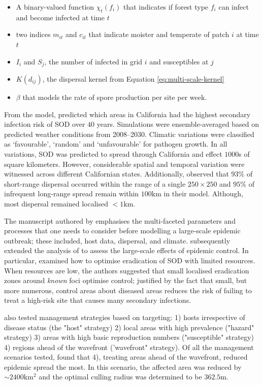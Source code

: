 \begin{itemize}
    \item A binary-valued function $\chi_t(f_i)$ that indicates if forest type $f_i$ can infect and become infected at time $t$
    \item two indices $m_{it}$ and $c_{it}$ that indicate moister and temperate of patch $i$ at time $t$
    \item $I_i$ and $S_j$, the number of infected in grid $i$ and susceptibles at $j$
    \item $K(d_{ij})$, the dispersal kernel from Equation \ref{eq:multi-scale-kernel}
    \item $\beta$ that models the rate of spore production per site per week.
\end{itemize}

From the model, \cite{meentemeyer2004mapping} predicted which areas in California
had the highest secondary infection risk of SOD over $40$ years.
Simulations were ensemble-averaged based on predicted weather conditions from 2008–2030.
Climatic variations were classified as `favourable', `random' and `unfavourable' for
pathogen growth.
In all variations, SOD was predicted to spread through California and effect $1000$s
of square kilometers. However, considerable spatial and temporal variation were witnessed
across different Californian states. Additionally, \cite{meentemeyer2004mapping} 
observed that $93\%$ of short-range dispersal occurred within the range of a single $\mathrm{250 \times 250}$ and 
$95\%$ of infrequent long-range spread remain within $100\mathrm{km}$ in their model.
Although, most dispersal remained localised $<1\mathrm{km}$.

The manuscript authored by \cite{meentemeyer2004mapping} emphasises the multi-faceted 
parameters and processes that one needs to consider before modelling a large-scale epidemic
outbreak; these included, host data, dispersal, and climate.
\cite{large-scale-control} subsequently extended the analysis of \cite{meentemeyer2004mapping}
to assess the large-scale effects of epidemic control. 
In particular, \cite{large-scale-control} examined how to optimise eradication of SOD with 
limited resources. When resources are low, the authors suggested that small localised 
eradication zones around \textit{known} foci optimise control; justified by the fact that
small, but more numerous, control areas about diseased areas reduces the risk of failing 
to treat a high-risk site that causes many secondary infections. 

\cite{large-scale-control} also tested management strategies based on targeting:
1) hosts irrespective of disease 
status (the "host" strategy)
2) local areas with high prevalence ("hazard" strategy)
3) areas with high basic reproduction numbers ("susceptible" strategy)
4) regions ahead of the wavefront ('wavefront" strategy).
Of all the management scenarios tested, \cite{large-scale-control} found
that 4), treating areas ahead of the wavefront, reduced epidemic spread the most.
In this scenario, the affected area was reduced by $\sim 2400\mathrm{km^2}$ and 
the optimal culling radius was determined to be $362.5\mathrm{m}$.

